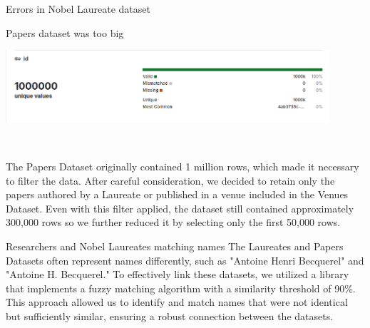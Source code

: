 \documentclass[aspectratio=169,xcolor=dvipsnames]{beamer}
\begin{document}
\begin{frame}{Errors in Nobel Laureate dataset}
	\begin{table}[H]
		\centering
		\caption{Example of dataset error}
		\label{tab:datasetError}
	\end{table}
\end{frame}

\begin{frame}{Papers dataset was too big}
    \centering
    \begin{minipage}{0.8\textwidth}
        \centering
        \includegraphics[width=0.9\textwidth]{huge_dataset.png}
    \end{minipage} \\
    \vspace{1em}
    \begin{minipage}{0.8\textwidth}
        The Papers Dataset originally contained 1 million rows, which made it necessary to filter the data.
		After careful consideration, we decided to retain only the papers authored by a Laureate or published
		in a venue included in the Venues Dataset.
        Even with this filter applied, the dataset still contained approximately 300,000 rows so we further
		reduced it by selecting only the first 50,000 rows.
    \end{minipage}
\end{frame}

\begin{frame}{Researchers and Nobel Laureates matching names}
        The Laureates and Papers Datasets often represent names differently, such as "Antoine Henri Becquerel"
		and "Antoine H. Becquerel." To effectively link these datasets, we utilized a library that implements a
		fuzzy matching algorithm with a similarity threshold of 90\%. This approach allowed us to identify and
		match names that were not identical but sufficiently similar, ensuring a robust connection between the
		datasets.
\end{frame}
\end{document}
